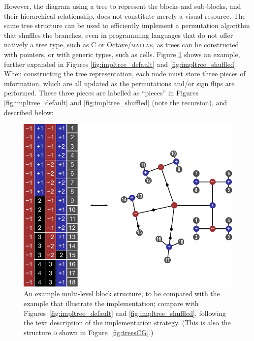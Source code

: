 However, the diagram using a tree to represent the blocks and sub-blocks, and their hierarchical relationship, does not constitute merely a visual resource. The same tree structure can be used to efficiently implement a permutation algorithm that shuffles the branches, even in programming languages that do not offer natively a tree type, such as C or Octave/\textsc{matlab}, as trees can be constructed with pointers, or with generic types, such as cells. Figure \ref{fig:impltree_example} shows an example, further expanded in Figures \ref{fig:impltree_default} and \ref{fig:impltree_shuffled}. When constructing the tree representation, each node must store three pieces of information, which are all updated as the permutations and/or sign flips are performed. These three pieces are labelled as ``pieces'' in Figures \ref{fig:impltree_default} and \ref{fig:impltree_shuffled} (note the recursion), and described below:

\begin{figure}[!t]
\centering
\hspace*{0cm}\includegraphics{figures/impltree_example.pdf}
\vspace{1cm}
\caption[An example multi-level block structure.]{An example multi-level block structure, to be compared with the example that illustrate the implementation; compare with Figures~\ref{fig:impltree_default} and \ref{fig:impltree_shuffled}, following the text description of the implementation strategy. (This is also the structure \textsc{d} shown in Figure~\ref{fig:treesCG}.)}
\label{fig:impltree_example}
\end{figure}

